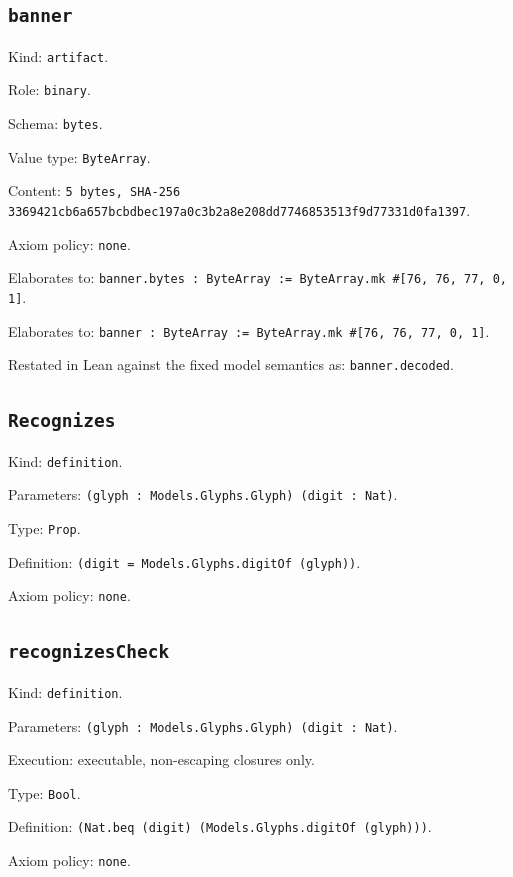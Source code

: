 \documentclass[11pt]{article}
\begin{document}
\subsection*{\texttt{banner}}
\noindent Kind: \texttt{artifact}.\par
\noindent Role: \texttt{binary}.\par
\noindent Schema: \texttt{bytes}.\par
\noindent Value type: \texttt{ByteArray}.\par
\noindent Content: \texttt{5 bytes, SHA-256 3369421cb6a657bcbdbec197a0c3b2a8e208dd7746853513f9d77331d0fa1397}.\par
\noindent Axiom policy: \texttt{none}.\par
\noindent Elaborates to: \texttt{banner.bytes : ByteArray := ByteArray.mk \#[76, 76, 77, 0, 1]}.\par
\noindent Elaborates to: \texttt{banner : ByteArray := ByteArray.mk \#[76, 76, 77, 0, 1]}.\par
\noindent Restated in Lean against the fixed model semantics as: \texttt{banner.decoded}.\par
\subsection*{\texttt{Recognizes}}
\noindent Kind: \texttt{definition}.\par
\noindent Parameters: \texttt{(glyph : Models.Glyphs.Glyph) (digit : Nat)}.\par
\noindent Type: \texttt{Prop}.\par
\noindent Definition: \texttt{(digit = Models.Glyphs.digitOf (glyph))}.\par
\noindent Axiom policy: \texttt{none}.\par
\subsection*{\texttt{recognizesCheck}}
\noindent Kind: \texttt{definition}.\par
\noindent Parameters: \texttt{(glyph : Models.Glyphs.Glyph) (digit : Nat)}.\par
\noindent Execution: executable, non-escaping closures only.\par
\noindent Type: \texttt{Bool}.\par
\noindent Definition: \texttt{(Nat.beq (digit) (Models.Glyphs.digitOf (glyph)))}.\par
\noindent Axiom policy: \texttt{none}.\par
\end{document}
